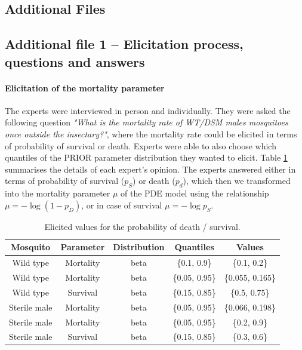\documentclass[]{bmcart}
\begin{document}
\begin{backmatter}


\newpage
\section*{Additional Files}

\subsection{Additional file 1 -- Elicitation process, questions and answers}

\paragraph{Elicitation of the mortality parameter}
The experts were interviewed in person and individually. They were asked the following question \emph{"What is the mortality rate of WT/DSM males mosquitoes once outside the insectary?"}, where the mortality rate could be elicited in terms of probability of  survival or death. Experts were able to also choose which quantiles of the PRIOR  parameter distribution they wanted to elicit. Table \ref{tble:elicit_mort} summarises the details of each expert's opinion. The experts answered either in terms of probability of survival ($p_S$) or  death ($p_d$), which then we transformed into the mortality parameter $\mu$ of the PDE model using the relationship $\mu = - \log( 1-p_D)$, or in case of survival $\mu = -\log p_S$.
\begin{table}[h]
\centering
\begin{tabular}{|c|cccc|}
\hline
Mosquito & Parameter & Distribution & Quantiles & Values  \\\hline
Wild type & Mortality & beta & \{0.1, 0.9\} & \{0.1, 0.2\}\\
Wild type & Mortality & beta & \{0.05, 0.95\} & \{0.055, 0.165\}\\
Wild type & Survival & beta & \{0.15, 0.85\} & \{0.5, 0.75\}\\
Sterile male & Mortality & beta & \{0.05, 0.95\} & \{0.066, 0.198\}\\
Sterile male & Mortality & beta & \{0.05, 0.95\} & \{0.2, 0.9\}\\
Sterile male & Survival & beta & \{0.15, 0.85\} & \{0.3, 0.6\}\\
\hline
\end{tabular}
\caption{\label{tble:elicit_mort} Elicited values for the probability of death / survival. }
\end{table}



\end{backmatter}
\end{document}
